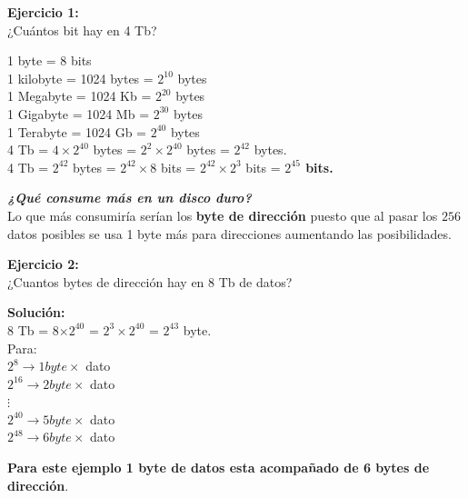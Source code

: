 \documentclass{templateNote}
\begin{document}
\begin{tcolorbox}[colback=green!5!white,colframe=green!75!black,title=Ejercicio]
    \textbf{Ejercicio 1:} \\
    ¿Cuántos bit hay en 4 Tb?
    \begin{center}
        1 byte = 8 bits \\
        1 kilobyte = 1024 bytes = $2^{10}$ bytes \\
        1 Megabyte = 1024 Kb = $2^{20}$ bytes  \\
        1 Gigabyte = 1024 Mb = $2^{30}$ bytes  \\
        1 Terabyte = 1024 Gb = $2^{40}$ bytes  \\ 
        4 Tb = $4\times2^{40}$ bytes = $2^{2}\times2^{40}$ bytes = $2^{42}$ bytes. \\
        4 Tb = $2^{42}$ bytes = $2^{42}\times8$ bits = $2^{42}\times2^{3}$ bits = \textbf{$2^{45}$ bits.} \\
    \end{center}
\end{tcolorbox}

\noindent \textit{\textbf{¿Qué consume más en un disco duro?}}\\
Lo que más consumiría serían los \textbf{byte de dirección} puesto que al pasar los $256$ datos posibles se usa 1 byte más para direcciones aumentando las posibilidades. 

\begin{tcolorbox}[colback=green!5!white,colframe=green!75!black,title=Ejercicio]
    \textbf{Ejercicio 2:} \\
    ¿Cuantos bytes de dirección hay en 8 Tb de datos? \\
    \begin{center}
        \textbf{Solución:} \\
        8 Tb = 8$\times2^{40}$ = $2^{3}\times2^{40}$ = $2^{43}$ byte.\\
        Para: \\
        $2^{8}\rightarrow 1 $\space$byte \times$ dato \\
        $2^{16}\rightarrow 2 $\space$byte \times$ dato \\
        $\vdots$ \\
        $2^{40}\rightarrow 5 $\space$byte \times$ dato \\
        $2^{48}\rightarrow 6 $\space$byte \times$ dato \\
    \end{center}
    \textbf{Para este ejemplo 1 byte de datos esta acompañado de 6 bytes de dirección}.
\end{tcolorbox}
\end{document}
